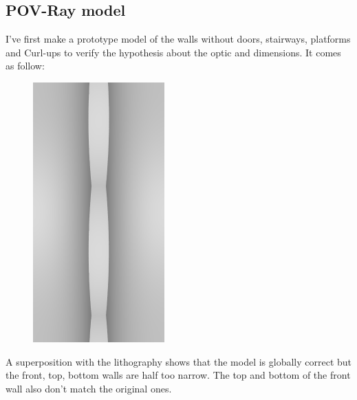 \documentclass[12pt, a4paper]{article}
\begin{document}
\subsection{POV-Ray model}

I've first make a prototype model of the walls without doors, stairways, platforms and Curl-ups to verify the hypothesis about the optic and dimensions. It comes as follow:\\

\begin{scriptsize}
\begin{ttfamily}

\end{ttfamily}
\end{scriptsize}

\begin{center}
\begin{figure}[H]
\centering\includegraphics[height=10cm]{./XL-51_1.png}\\
\end{figure}
\end{center}

A superposition with the lithography shows that the model is globally correct but the front, top, bottom walls are half too narrow. The top and bottom of the front wall also don't match the original ones.\\
\end{document}

